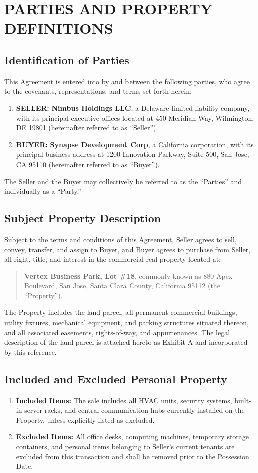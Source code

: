 \section{PARTIES AND PROPERTY DEFINITIONS}

\subsection{Identification of Parties}
This Agreement is entered into by and between the following parties, who agree to the covenants, representations, and terms set forth herein:
\begin{enumerate}
    \item \textbf{SELLER:} \textbf{Nimbus Holdings LLC}, a Delaware limited liability company, with its principal executive offices located at 450 Meridian Way, Wilmington, DE 19801 (hereinafter referred to as ``Seller'').
    \item \textbf{BUYER:} \textbf{Synapse Development Corp}, a California corporation, with its principal business address at 1200 Innovation Parkway, Suite 500, San Jose, CA 95110 (hereinafter referred to as ``Buyer'').
\end{enumerate}
The Seller and the Buyer may collectively be referred to as the ``Parties'' and individually as a ``Party.''

\subsection{Subject Property Description}
Subject to the terms and conditions of this Agreement, Seller agrees to sell, convey, transfer, and assign to Buyer, and Buyer agrees to purchase from Seller, all right, title, and interest in the commercial real property located at:
\begin{quote}
    \textbf{Vertex Business Park, Lot \#18}, commonly known as 880 Apex Boulevard, San Jose, Santa Clara County, California 95112 (the ``Property'').
\end{quote}
The Property includes the land parcel, all permanent commercial buildings, utility fixtures, mechanical equipment, and parking structures situated thereon, and all associated easements, rights-of-way, and appurtenances. The legal description of the land parcel is attached hereto as Exhibit A and incorporated by this reference.

\subsection{Included and Excluded Personal Property}
\begin{enumerate}
    \item \textbf{Included Items:} The sale includes all HVAC units, security systems, built-in server racks, and central communication hubs currently installed on the Property, unless explicitly listed as excluded.
    \item \textbf{Excluded Items:} All office desks, computing machines, temporary storage containers, and personal items belonging to Seller's current tenants are excluded from this transaction and shall be removed prior to the Possession Date.
\end{enumerate}
